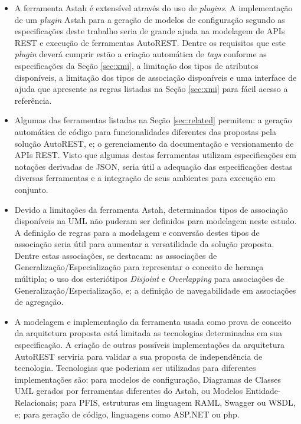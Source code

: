 \begin{itemize}
    \item A ferramenta Astah é extensível através do uso de \textit{plugins}. A implementação de um \textit{plugin} Astah para a geração de modelos de configuração segundo as especificações deste trabalho seria de grande ajuda na modelagem de APIs REST e execução de ferramentas AutoREST. Dentre os requisitos que este \textit{plugin} deverá cumprir estão a criação automática de \textit{tags} conforme as especificações da Seção \ref{sec:xmi}, a limitação dos tipos de atributos disponíveis, a limitação dos tipos de associação disponíveis e uma interface de ajuda que apresente as regras listadas na Seção \ref{sec:xmi} para fácil acesso a referência.
    
    \item Algumas das ferramentas listadas na Seção \ref{sec:related} permitem: a geração automática de código para funcionalidades diferentes das propostas pela solução AutoREST, e; o gerenciamento da documentação e versionamento de APIs REST. Visto que algumas destas ferramentas utilizam especificações em notações derivadas de JSON, seria útil a adequação das especificações destas diversas ferramentas e a integração de seus ambientes para execução em conjunto.
    
    \item Devido a limitações da ferramenta Astah, determinados tipos de associação disponíveis na UML não puderam ser definidos para modelagem neste estudo. A definição de regras para a modelagem e conversão destes tipos de associação seria útil para aumentar a versatilidade da solução proposta. Dentre estas associações, se destacam: as associações de Generalização/Especialização para representar o conceito de herança múltipla; o uso dos esteriótipos \textit{Disjoint} e \textit{Overlapping} para associações de Generalização/Especialização, e; a definição de navegabilidade em associações de agregação.
    
    \item A modelagem e implementação da ferramenta usada como prova de conceito da arquitetura proposta está limitada as tecnologias determinadas em sua especificação. A criação de outras possíveis implementações da arquitetura AutoREST serviria para validar a sua proposta de independência de tecnologia. Tecnologias que poderiam ser utilizadas para diferentes implementações são: para modelos de configuração, Diagramas de Classes UML gerados por ferramentas diferentes do Astah, ou Modelos Entidade-Relacionais; para PFIS, estruturas em linguagem RAML, Swagger ou WSDL, e; para geração de código, linguagens como ASP.NET ou php.
\end{itemize}